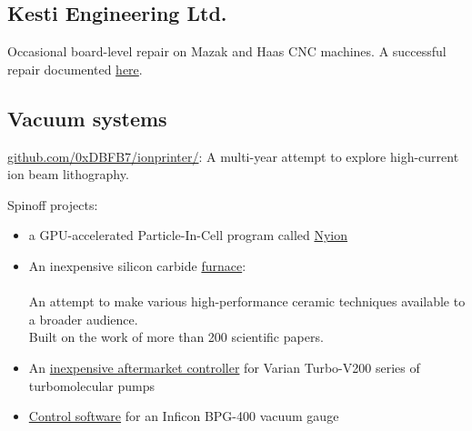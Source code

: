 \documentclass[fleqn,11pt]{article}
\begin{document}
{\begin{multicols}{1}
\subsection*{Kesti Engineering Ltd.}

Occasional board-level repair on Mazak and Haas CNC machines. A successful repair documented \href{https://0xdbfb7.com/meldas.html}{here}.
%
%
%
\subsection*{Vacuum systems}

\href{https://github.com/0xDBFB7/ionprinter/}{github.com/0xDBFB7/ionprinter/}: A multi-year attempt to explore high-current ion beam lithography. 

Spinoff projects:
\begin{itemize}
	\item a GPU-accelerated Particle-In-Cell program called \href{https://github.com/0xDBFB7/Nyion}{Nyion}
	\item An inexpensive silicon carbide \href{https://0xdbfb7.com/furnace.html}{furnace}:\\ \\
	An attempt to make various high-performance ceramic techniques available to a broader audience.\\ Built on the work of more than 200 scientific papers. 
	\item An \href{https://github.com/0xDBFB7/varian-turbo-controller}{inexpensive aftermarket controller} for Varian Turbo-V200 series of turbomolecular pumps 
	\item \href{https://gist.github.com/0xDBFB7/7bd7048c6639270e6f291a2673903184}{Control software} for an Inficon BPG-400 vacuum gauge
\end{itemize}


\end{multicols}}
\end{document}
